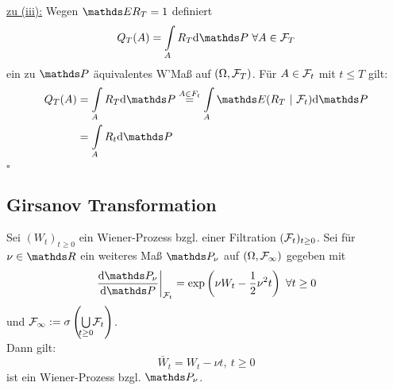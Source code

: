 \uline{zu (iii):}
Wegen $\E R_T=1$ definiert
\[
Q_T(A)=\int\ablim{A}R_T\dint\Pw~\forall A\in \F_T
\]
ein zu $\Pw$ äquivalentes W'Maß auf $(\Omega,\mathcal{F}_T)$.
Für $A\in \mathcal{F}_t$ mit $t\le T$ gilt:
\begin{equation*}
\begin{aligned}
	Q_T(A) &= \int\ablim{A}R_T\dint\Pw \stackrel{A\in F_t}{=} \int\ablim{A}\E(R_T~|~\F_t)\dint\Pw\\
	&= \int\ablim{A}R_t\dint\Pw
\end{aligned}
\end{equation*}
\hfill $\square$

\subsection{Girsanov Transformation}
\label{sub:girsanov_transformation}
Sei $(W_t)_{t\ge 0}$ ein Wiener-Prozess bzgl. einer Filtration $(\mathcal{F}_t)_{t\ge0}$.
Sei für $\nu\in \R$ ein weiteres Maß $\Pw_\nu$ auf $(\Omega,\mathcal{F}_\infty)$ gegeben mit
\[
\left.\frac{\dint\Pw_\nu}{\dint \Pw}\right|_{\F_t}=\exp\enbrace{\nu W_t-\frac{1}{2}\nu^2t}~\forall t\ge0
\]
und $\F_\infty:=\sigma\enbrace{\bigcup\ablim{t\ge0}\F_t}$.\\
Dann gilt:
\[
\bar{W}_t=W_t-\nu t,~t\ge 0
\]
ist ein Wiener-Prozess bzgl. $\Pw_\nu$.\\

